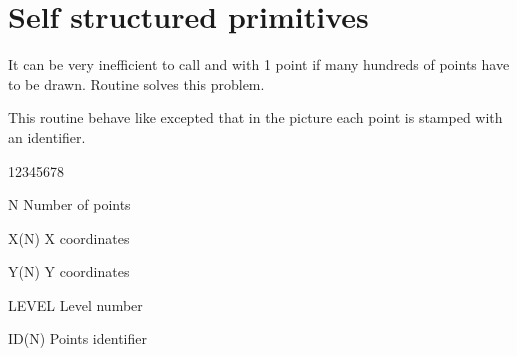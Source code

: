 \section{Self structured primitives}

It can be very inefficient to call  and  with 1 point 
if  many hundreds of points have to be drawn. 
Routine  solves this problem.

\Action
This routine behave like  excepted that in the \HIGZ{}
picture each point is stamped with an identifier.
\Pdesc
\begin{DLtt}{12345678}
   \item[N] Number of points
   \item[X(N)] X coordinates
   \item[Y(N)] Y coordinates
   \item[LEVEL] Level number
   \item[ID(N)] Points identifier
\end{DLtt}

\clearpage

